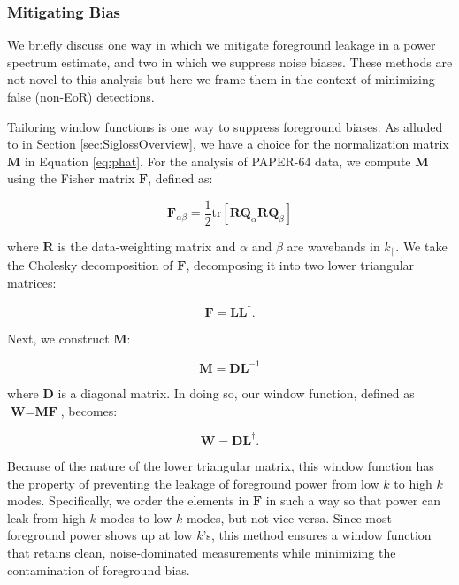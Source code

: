 \documentclass[preprint2,numberedappendix,tighten]{aastex6}  %
\begin{document}
\subsubsection{Mitigating Bias}

We briefly discuss one way in which we mitigate foreground leakage in a power spectrum estimate, and two in which we suppress noise biases. These methods are not novel to this analysis but here we frame them in the context of minimizing false (non-EoR) detections.

Tailoring window functions is one way to suppress foreground biases. As alluded to in Section \ref{sec:SiglossOverview}, we have a choice for the normalization matrix $\textbf{M}$ in Equation \ref{eq:phat}. For the analysis of PAPER-64 data, we compute $\textbf{M}$ using the Fisher matrix $\textbf{F}$, defined as:

\begin{equation}
\textbf{F}_{\alpha\beta} = \frac{1}{2} \text{tr} [\textbf{R}\textbf{Q}_{\alpha}\textbf{R}\textbf{Q}_{\beta} ]
\end{equation}

\noindent where $\textbf{R}$ is the data-weighting matrix and $\alpha$ and $\beta$ are wavebands in $k_{\parallel}$. We take the Cholesky decomposition of $\textbf{F}$, decomposing it into two lower triangular matrices:

\begin{equation}
\textbf{F} = \textbf{LL}^{\dagger}.
\end{equation}

\noindent Next, we construct $\textbf{M}$:

\begin{equation}
\textbf{M} = \textbf{DL}^{-1}
\end{equation}

\noindent where $\textbf{D}$ is a diagonal matrix. In doing so, our window function, defined as $\textbf{W} = \textbf{MF}$, becomes:

\begin{equation}
\textbf{W} = \textbf{DL}^{\dagger}.
\end{equation}

\noindent Because of the nature of the lower triangular matrix, this window function has the property of preventing the leakage of foreground power from low $k$ to high $k$ modes. Specifically, we order the elements in $\textbf{F}$ in such a way so that power can leak from high $k$ modes to low $k$ modes, but not vice versa. Since most foreground power shows up at low $k$'s, this method ensures a window function that retains clean, noise-dominated measurements while minimizing the contamination of foreground bias.
\end{document}
